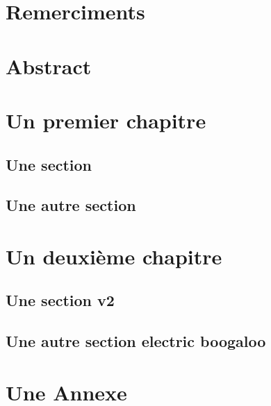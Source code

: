 \documentclass[a4paper, twoside]{report}
\begin{document}
\chapter*{Remerciments}

    \lipsum[1]

\clearpage

{ \hypersetup{hidelinks} \tableofcontents {} }

\setcounter{page}{1}
\chapter*{Abstract}
\label{chap:abstract}
\lipsum[1-2]

\chapter{Un premier chapitre}

\lipsum[1]
\section{Une section}
\lipsum
\section{Une autre section}
\lipsum

\chapter{Un deuxième chapitre}

\lipsum[1]
\section{Une section v2}
\lipsum
\section{Une autre section electric boogaloo}
\lipsum






\appendix
\appendixpage
\addappheadtotoc

\chapter{Une Annexe}
\end{document}
